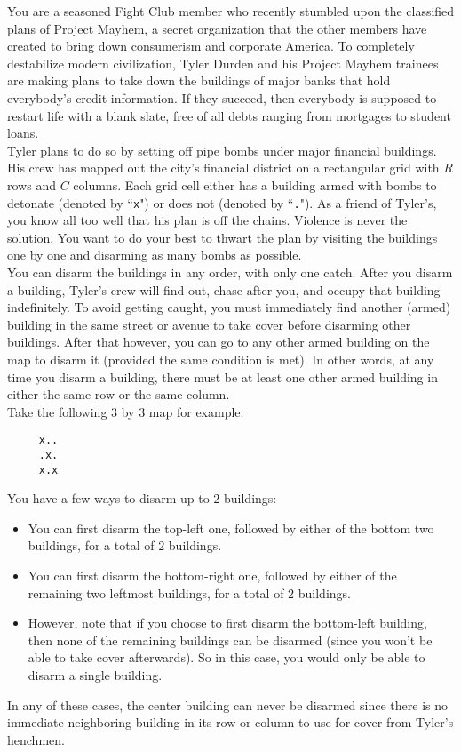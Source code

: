 
\noindent You are a seasoned Fight Club member who recently stumbled upon the classified plans of Project Mayhem, a secret organization that the other members have created to bring down consumerism and corporate America. To completely destabilize modern civilization, Tyler Durden and his Project Mayhem trainees are making plans to take down the buildings of major banks that hold everybody's credit information. If they succeed, then everybody is supposed to restart life with a blank slate, free of all debts ranging from mortgages to student loans.\\

Tyler plans to do so by setting off pipe bombs under major financial buildings. His crew has mapped out the city's financial district on a rectangular grid with $R$ rows and $C$ columns. Each grid cell either has a building armed with bombs to detonate (denoted by ``\texttt{x}") or does not (denoted by ``\texttt{.}"). As a friend of Tyler's, you know all too well that his plan is off the chains. Violence is never the solution. You want to do your best to thwart the plan by visiting the buildings one by one and disarming as many bombs as possible.\\

You can disarm the buildings in any order, with only one catch. After you disarm a building, Tyler's crew will find out, chase after you, and occupy that building indefinitely. To avoid getting caught, you must immediately find another (armed) building in the same street or avenue to take cover before disarming other buildings. After that however, you can go to any other armed building on the map to disarm it (provided the same condition is met). In other words, at any time you disarm a building, there must be at least one other armed building in either the same row or the same column.\\

\noindent Take the following $3$ by $3$ map for example:

\begin{verbatim}
     x..
     .x.
     x.x
\end{verbatim}

\noindent You have a few ways to disarm up to $2$ buildings:
\begin{itemize}
\item You can first disarm the top-left one, followed by either of the bottom two buildings, for a total of $2$ buildings.
\item You can first disarm the bottom-right one, followed by either of the remaining two leftmost buildings, for a total of $2$ buildings.
\item However, note that if you choose to first disarm the bottom-left building, then none of the remaining buildings can be disarmed (since you won't be able to take cover afterwards). So in this case, you would only be able to disarm a single building.
\end{itemize}
In any of these cases, the center building can never be disarmed since there is no immediate neighboring building in its row or column to use for cover from Tyler's henchmen.\\

